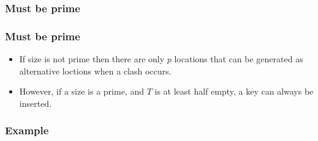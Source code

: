 \documentclass{beamer}
\begin{document}
\subsubsection{Must be prime}
\begin{frame}
\frametitle{Must be prime}
\begin{itemize}
\item If size is not prime then there are only $p$ locations that can be generated as alternative loctions when a clash occurs.
\item However, if a size is a prime, and $T$ is at least half empty, a key can always be inserted.
\end{itemize}
\end{frame}
\subsubsection{Example}
\end{document}
